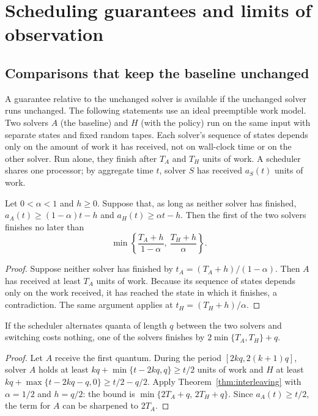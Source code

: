 \section{Scheduling guarantees and limits of observation}\label{sec:scheduling}

\subsection{Comparisons that keep the baseline unchanged}\label{sec:effort-baseline}

A guarantee relative to the unchanged solver is available if the unchanged
solver runs unchanged. The following statements use an ideal preemptible work
model. Two solvers $A$ (the baseline) and $H$ (with the policy) run on the same
input with separate states and fixed random tapes. Each solver's sequence of
states depends only on the amount of work it has received, not on wall-clock
time or on the other solver. Run alone, they finish after $T_A$ and $T_H$ units
of work. A scheduler shares one processor; by aggregate time $t$, solver $S$
has received $a_S(t)$ units of work.

\begin{theorem}[Interleaving]\label{thm:interleaving}
Let $0<\alpha<1$ and $h\ge0$. Suppose that, as long as neither solver has
finished, $a_A(t)\ge(1-\alpha)t-h$ and $a_H(t)\ge\alpha t-h$. Then the first
of the two solvers finishes no later than
\begin{equation}\label{eq:interleaving}
 \min\left\{\frac{T_A+h}{1-\alpha},\ \frac{T_H+h}{\alpha}\right\}.
\end{equation}
\end{theorem}

\begin{proof}
Suppose neither solver has finished by $t_A=(T_A+h)/(1-\alpha)$. Then $A$ has
received at least $T_A$ units of work. Because its sequence of states depends
only on the work received, it has reached the state in which it finishes, a
contradiction. The same argument applies at $t_H=(T_H+h)/\alpha$.
\end{proof}

\begin{corollary}\label{cor:equal-shares}
If the scheduler alternates quanta of length $q$ between the two solvers and
switching costs nothing, one of the solvers finishes by
$2\min\{T_A,T_H\}+q$.
\end{corollary}

\begin{proof}
Let $A$ receive the first quantum. During the period $[2kq,2(k+1)q]$, solver
$A$ holds at least $kq+\min\{t-2kq,q\}\ge t/2$ units of work and $H$ at least
$kq+\max\{t-2kq-q,0\}\ge t/2-q/2$. Apply Theorem~\ref{thm:interleaving} with
$\alpha=1/2$ and $h=q/2$: the bound is
$\min\{2T_A+q,\,2T_H+q\}$. Since $a_A(t)\ge t/2$, the term for $A$ can be
sharpened to $2T_A$.
\end{proof}

